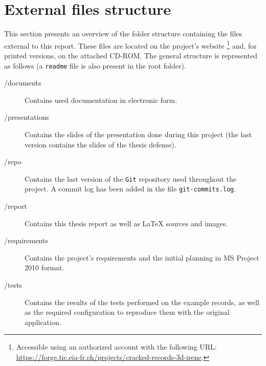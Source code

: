 
\cleardoublepage
\chapter{External files structure}
\label{chap:arch-content}

This section presents an overview of the folder structure containing the files external to this report. These files are located on the project's website \footnote{Accessible using an authorized account with the following URL: \url{https://forge.tic.eia-fr.ch/projects/cracked-records-3d-irene}.} and, for printed versions, on the attached CD-ROM. The general structure is represented as follows (a \texttt{readme} file is also present in the root folder).

\begin{description}
\item[/documents] Contains used documentation in electronic form.
\item[/presentations] Contains the slides of the presentation done during this project (the last version contains the slides of the thesis defense).
\item[/repo] Contains the last version of the \texttt{Git} repository used throughout the project. A commit log has been added in the file \texttt{git-commits.log}.
\item[/report] Contains this thesis report as well as \LaTeX{} sources and images.
\item[/requirements] Contains the project's requirements and the initial planning in MS Project 2010 format.
\item[/tests] Contains the results of the tests performed on the example records, as well as the required configuration to reproduce them with the original application.
\end{description}
